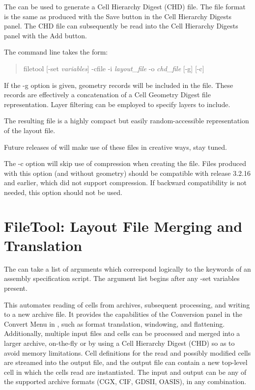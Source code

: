The {\FileTool} can be used to generate a Cell Hierarchy Digest (CHD)
file.  The file format is the same as produced with the {\cb Save}
button in the {\cb Cell Hierarchy Digests} panel.  The CHD file can
subsequently be read into the {\cb Cell Hierarchy Digests} panel with
the {\cb Add} button.

The command line takes the form:
\begin{quote}
{\vt filetool} [{\vt -set} {\it variables\/}] {\vt -cfile}
  {\vt -i} {\it layout\_file} {\vt -o} {\it chd\_file} [{\vt -g}] [{\vt -c}]
\end{quote}

If the {\vt -g} option is given, geometry records will be included in
the file.  These records are effectively a concatenation of a Cell
Geometry Digest file representation.  Layer filtering can be employed
to specify layers to include.

The resulting file is a highly compact but easily random-accessible
representation of the layout file.

Future releases of {\Xic} will make use of these files in creative
ways, stay tuned.

The {\vt -c} option will skip use of compression when creating the
file.  Files produced with this option (and without geometry) should
be compatible with {\Xic} release 3.2.16 and earlier, which did not
support compression.  If backward compatibility is not needed, this
option should not be used.

\section{FileTool:  Layout File Merging and Translation}

The {\FileTool} can take a list of arguments which correspond
logically to the keywords of an assembly specification script.  The
argument list begins after any {\vt -set} variables present.

This automates reading of cells from archives, subsequent processing,
and writing to a new archive file.  It provides the capabilities of
the {\cb Conversion} panel in the {\cb Convert Menu} in {\Xic}, such
as format translation, windowing, and flattening.  Additionally,
multiple input files and cells can be processed and merged into a
larger archive, on-the-fly or by using a Cell Hierarchy Digest (CHD)
so as to avoid memory limitations.  Cell definitions for the read and
possibly modified cells are streamed into the output file, and the
output file can contain a new top-level cell in which the cells read
are instantiated.  The input and output can be any of the supported
archive formats (CGX, CIF, GDSII, OASIS), in any combination.

